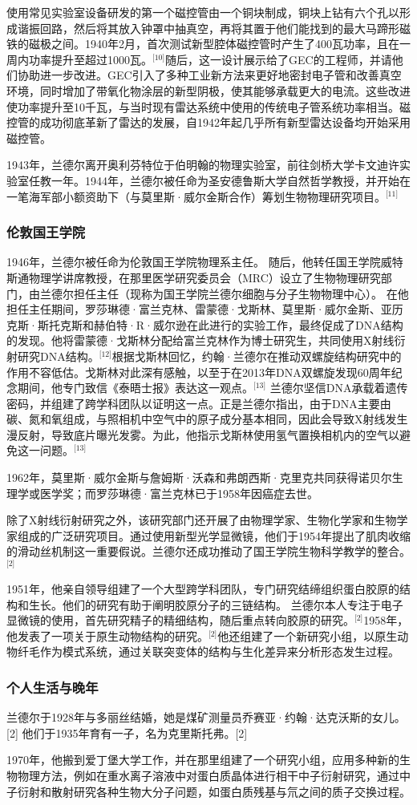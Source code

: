 使用常见实验室设备研发的第一个磁控管由一个铜块制成，铜块上钻有六个孔以形成谐振回路，然后将其放入钟罩中抽真空，再将其置于他们能找到的最大马蹄形磁铁的磁极之间。1940年2月，首次测试新型腔体磁控管时产生了400瓦功率，且在一周内功率提升至超过1000瓦。\(^\text{[10]}\)随后，这一设计展示给了GEC的工程师，并请他们协助进一步改进。GEC引入了多种工业新方法来更好地密封电子管和改善真空环境，同时增加了带氧化物涂层的新型阴极，使其能够承载更大的电流。这些改进使功率提升至10千瓦，与当时现有雷达系统中使用的传统电子管系统功率相当。磁控管的成功彻底革新了雷达的发展，自1942年起几乎所有新型雷达设备均开始采用磁控管。

1943年，兰德尔离开奥利芬特位于伯明翰的物理实验室，前往剑桥大学卡文迪许实验室任教一年。1944年，兰德尔被任命为圣安德鲁斯大学自然哲学教授，并开始在一笔海军部小额资助下（与莫里斯·威尔金斯合作）筹划生物物理研究项目。\(^\text{[11]}\)
\subsubsection{伦敦国王学院}
1946年，兰德尔被任命为伦敦国王学院物理系主任。 随后，他转任国王学院威特斯通物理学讲席教授，在那里医学研究委员会（MRC）设立了生物物理研究部门，由兰德尔担任主任（现称为国王学院兰德尔细胞与分子生物物理中心）。 在他担任主任期间，罗莎琳德·富兰克林、雷蒙德·戈斯林、莫里斯·威尔金斯、亚历克斯·斯托克斯和赫伯特·R·威尔逊在此进行的实验工作，最终促成了DNA结构的发现。他将雷蒙德·戈斯林分配给富兰克林作为博士研究生，共同使用X射线衍射研究DNA结构。\(^\text{[12]}\)根据戈斯林回忆，约翰·兰德尔在推动双螺旋结构研究中的作用不容低估。戈斯林对此深有感触，以至于在2013年DNA双螺旋发现60周年纪念期间，他专门致信《泰晤士报》表达这一观点。\(^\text{[13]}\) 兰德尔坚信DNA承载着遗传密码，并组建了跨学科团队以证明这一点。正是兰德尔指出，由于DNA主要由碳、氮和氧组成，与照相机中空气中的原子成分基本相同，因此会导致X射线发生漫反射，导致底片曝光发雾。为此，他指示戈斯林使用氢气置换相机内的空气以避免这一问题。\(^\text{[13]}\)

1962年，莫里斯·威尔金斯与詹姆斯·沃森和弗朗西斯·克里克共同获得诺贝尔生理学或医学奖；而罗莎琳德·富兰克林已于1958年因癌症去世。

除了X射线衍射研究之外，该研究部门还开展了由物理学家、生物化学家和生物学家组成的广泛研究项目。通过使用新型光学显微镜，他们于1954年提出了肌肉收缩的滑动丝机制这一重要假说。兰德尔还成功推动了国王学院生物科学教学的整合。\(^\text{[2]}\)

1951年，他亲自领导组建了一个大型跨学科团队，专门研究结缔组织蛋白胶原的结构和生长。他们的研究有助于阐明胶原分子的三链结构。 兰德尔本人专注于电子显微镜的使用，首先研究精子的精细结构，随后重点转向胶原的研究。\(^\text{[2]}\)1958年，他发表了一项关于原生动物结构的研究。\(^\text{[2]}\)他还组建了一个新研究小组，以原生动物纤毛作为模式系统，通过关联突变体的结构与生化差异来分析形态发生过程。
\subsubsection{个人生活与晚年}
兰德尔于1928年与多丽丝结婚，她是煤矿测量员乔赛亚·约翰·达克沃斯的女儿。[2] 他们于1935年育有一子，名为克里斯托弗。[2]

1970年，他搬到爱丁堡大学工作，并在那里组建了一个研究小组，应用多种新的生物物理方法，例如在重水离子溶液中对蛋白质晶体进行相干中子衍射研究，通过中子衍射和散射研究各种生物大分子问题，如蛋白质残基与氘之间的质子交换过程。
